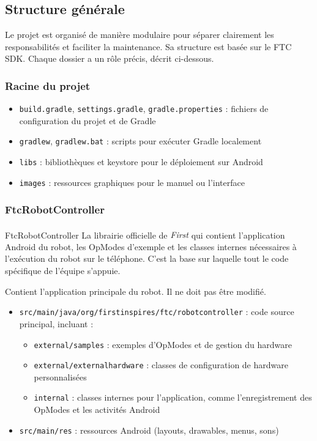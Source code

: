 \documentclass[12pt, a4paper]{report}
\newcommand{\registeredcompany}[1]{\textit{#1\textsuperscript{\tiny\textregistered}}}
\begin{document}
    \subsection{Structure générale}

    Le projet est organisé de manière modulaire pour séparer clairement les responsabilités et faciliter la maintenance. Sa structure est basée sur le FTC SDK. Chaque dossier a un rôle précis, décrit ci-dessous.

    \subsubsection*{Racine du projet}
    \begin{itemize}
        \item \texttt{build.gradle}, \texttt{settings.gradle}, \texttt{gradle.properties} : fichiers de configuration du projet et de Gradle
        \item \texttt{gradlew}, \texttt{gradlew.bat} : scripts pour exécuter Gradle localement
        \item \texttt{libs} : bibliothèques et keystore pour le déploiement sur Android
        \item \texttt{images} : ressources graphiques pour le manuel ou l'interface
    \end{itemize}


    \subsubsection*{FtcRobotController}

    \begin{mydefinition}{FtcRobotController}
        La librairie officielle de \registeredcompany{First} qui contient l’application Android du robot, les OpModes d’exemple et les classes internes nécessaires à l’exécution du robot sur le téléphone.
        C’est la base sur laquelle tout le code spécifique de l’équipe s’appuie.
    \end{mydefinition}

    Contient l’application principale du robot. Il ne doit pas être modifié.
    \begin{itemize}
        \item \texttt{src/main/java/org/firstinspires/ftc/robotcontroller} : code source principal, incluant :
        \begin{itemize}
            \item \texttt{external/samples} : exemples d’OpModes et de gestion du hardware
            \item \texttt{external/externalhardware} : classes de configuration de hardware personnalisées
            \item \texttt{internal} : classes internes pour l’application, comme l’enregistrement des OpModes et les activités Android
        \end{itemize}
        \item \texttt{src/main/res} : ressources Android (layouts, drawables, menus, sons)
    \end{itemize}
\end{document}
